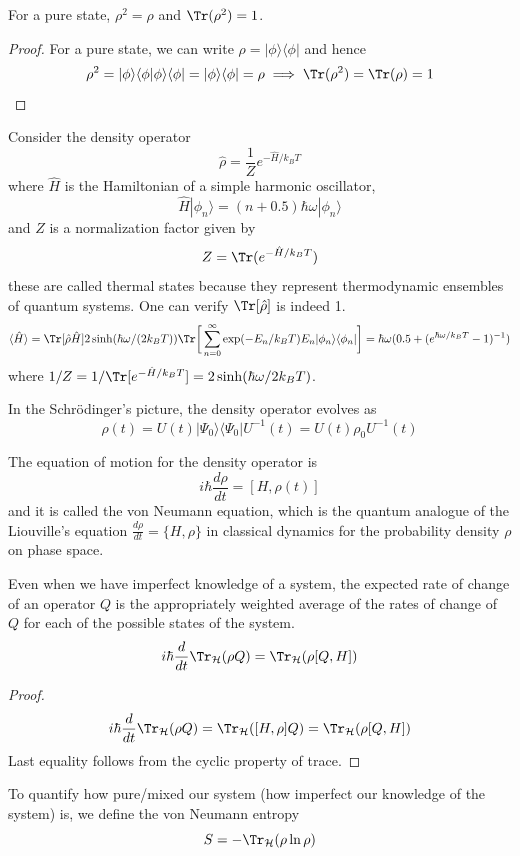 \documentclass[a4paper]{article}
\begin{document}
\begin{cor}
For a pure state, $\rho^2=\rho$ and $\Tr(\rho^2)=1$.
\end{cor}
\begin{proof}
For a pure state, we can write $\rho=|\phi\rangle\langle\phi|$ and hence
$$\rho^2=|\phi\rangle\langle\phi|\phi\rangle\langle\phi|=|\phi\rangle\langle\phi|=\rho\implies\Tr(\rho^2)=\Tr(\rho)=1$$
\end{proof}
\begin{eg}
Consider the density operator
$$\hat{\rho}=\frac{1}{Z}e^{-\hat{H}/k_BT}$$
where $\hat{H}$ is the Hamiltonian of a simple harmonic oscillator,
$$\hat{H}|\phi_n\rangle=(n+0.5)\hbar\omega|\phi_n\rangle$$
and $Z$ is a normalization factor given by
$$Z=\Tr(e^{-\hat{H}/k_BT})$$
these are called thermal states because they represent thermodynamic ensembles of quantum systems. One can verify $\Tr[\hat{\rho}]$ is indeed 1.
$$\langle\hat{H}\rangle=\Tr[\hat{\rho}\hat{H}]2\sinh(\hbar\omega/(2k_BT))\Tr\bigg[\sum_{n=0}^\infty\exp(-E_n/k_BT)E_n|\phi_n\rangle\langle\phi_n|\bigg]=\hbar\omega(0.5+(e^{\hbar\omega/k_BT}-1)^{-1})$$
where $1/Z=1/\Tr[e^{-\hat{H}/k_BT}]=2\sinh(\hbar\omega/2k_BT)$.
\end{eg}
In the Schr\"{o}dinger's picture, the density operator evolves as
$$\rho(t)=U(t)|\Psi_0\rangle\langle\Psi_0|U^{-1}(t)=U(t)\rho_0U^{-1}(t)$$
\begin{remarks}
The equation of motion for the density operator is
$$i\hbar\frac{d\rho}{dt}=[H,\rho(t)]$$
and it is called the von Neumann equation, which is the quantum analogue of the Liouville's equation $\frac{d\rho}{dt}=\{H,\rho\}$ in classical dynamics for the probability density $\rho$ on phase space.
\end{remarks}
\begin{prop}
Even when we have imperfect knowledge of a system, the expected rate of change of an operator $Q$ is the appropriately weighted average of the rates of change of $Q$ for each of the possible states of the system.
$$i\hbar\frac{d}{dt}\Tr_{\mathcal{H}}(\rho Q)=\Tr_{\mathcal{H}}(\rho[Q,H])$$
\end{prop}
\begin{proof}
$$i\hbar\frac{d}{dt}\Tr_{\mathcal{H}}(\rho Q)=\Tr_{\mathcal{H}}([H,\rho]Q)=\Tr_{\mathcal{H}}(\rho[Q,H])$$
Last equality follows from the cyclic property of trace.
\end{proof}
\begin{defi}
To quantify how pure/mixed our system (how imperfect our knowledge of the system) is, we define the von Neumann entropy 
$$S=-\Tr_{\mathcal{H}}(\rho\ln\rho)$$
\end{defi}
\end{document}
